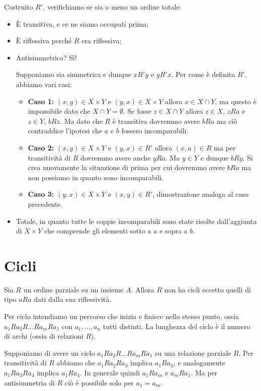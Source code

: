 \documentclass[12pt]{report}
\begin{document}
	Costruito $R'$, verifichiamo se sia o meno un ordine totale:
	\begin{itemize}
		\item È transitiva, e ce ne siamo occupati prima;
		\item È riflessiva perché $R$ era riflessiva;
		\item Antisimmetrica? Sì!
		
		Supponiamo sia simmetrica e dunque $x R' y$ e $y R' x$. Per come è definita $R'$, abbiamo vari casi:
		\begin{itemize}
			\item \textbf{Caso 1:} $(x, y) \in X \times Y$ e $(y, x) \in X \times Y$ allora $x \in X \cap Y$, ma questo è impossibile dato che $X \cap Y = \emptyset$. Se fosse $z \in X \cap Y$ allora $z \in X$, $zRa$ e $z \in Y$, $b Rz$. Ma dato che $R$ è transitiva dovremmo avere $bRa$ ma ciò contraddice l'ipotesi che $a$ e $b$ fossero incomparabili.
			\item \textbf{Caso 2:} $(x, y) \in X \times Y$ e $(y, x) \in R'$ allora $(x, a) \in R$ ma per transitività di $R$ dovremmo avere anche $yRa$. Ma $y \in Y$ e dunque $bRy$. Si crea nuovamente la situazione di prima per cui dovremmo avere $bRa$ ma non possiamo in quanto sono incomparabili.
			\item \textbf{Caso 3:} $(y, x) \in X \times Y$ e $(x, y) \in R'$, dimostrazione analoga al caso precedente.
		\end{itemize}
		
		\item Totale, in quanto tutte le coppie incomparabili sono state risolte dall'aggiunta di $X \times Y$ che comprende gli elementi sotto a $a$ e sopra a $b$.
	\end{itemize}
	
	\section{Cicli}
	
	Sia $R$ un ordine parziale su un insieme $A$. Allora $R$ non ha cicli eccetto quelli di tipo $aRa$ dati dalla sua riflessività.
	
	Per ciclo intendiamo un percorso che inizia e finisce nello stesso punto, ossia $a_1 R a_2 R \dots R a_m R a_1$ con $a_1, \dots, a_n$ tutti distinti. La lunghezza del ciclo è il numero di archi (ossia di relazioni $R$).
	
	\begin{dimostrazione}{}{}
		Supponiamo di avere un ciclo $a_1 R a_2 R \dots R a_m R a_1$ su una relazione parziale $R$. Per transitività di $R$ abbiamo che $a_1 R a_2 R a_3$ implica $a_1 R a_3$, e analogamente $a_1 R a_3 R a_4$ implica $a_1 R a_4$.
		In generale quindi $a_1 R a_m$ e $a_m R a_1$. Ma per antisimmetria di $R$ ciò è possibile solo per $a_1 = a_m$.
	\end{dimostrazione}
	
\end{document}
